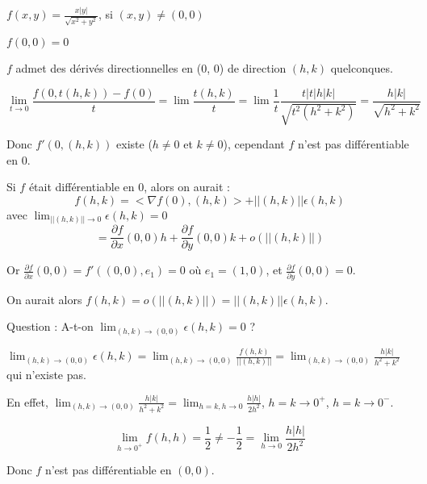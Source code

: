 		\begin{exemple} 
		
		$f(x, y) = \frac{x |y|}{\sqrt{x^2+y^2}}$, si $(x, y) \ne (0, 0)$
		
		$f(0, 0) = 0$
		
		$f$ admet des dérivés directionnelles en (0, 0) de direction $(h, k)$ quelconques.
		
		\[ \lim_{t \rightarrow 0} \frac{ f(0, t(h, k)) - f(0) }{t} = \lim \frac{ t(h, k)}{t} = \lim \frac{1}{t} \frac{t |t| h |k|}{ \sqrt{t^2 (h^2+k^2)}} = \frac{h|k|}{\sqrt{h^2+k^2}} \]
		
		Donc $f'(0, (h, k))$ existe ($h\ne0$ et $k\ne0$), cependant $f$ n'est pas différentiable en $0$.
		
		Si $f$ était différentiable en 0, alors on aurait : \[ f(h, k) = < \nabla f(0), (h, k)> + ||(h, k)|| \epsilon (h, k) \] 
		avec $\lim_{||(h, k)|| \rightarrow 0} \epsilon (h, k) = 0$
		\[ = \frac{ \partial f}{\partial x} (0, 0) h + \frac{ \partial f}{\partial y} (0, 0) k + o(||(h, k)||) \]
		
		Or $ \frac{ \partial f}{\partial x} (0, 0) = f' ((0, 0), e_1) = 0$ où $e_1 = (1, 0)$, et $ \frac{ \partial f}{\partial y} (0, 0) = 0$.
		
		On aurait alors $f(h, k) = o(||(h, k)||) = ||(h, k)|| \epsilon (h, k)$.
		
		Question : A-t-on $\lim_{(h, k) \rightarrow (0, 0)} \epsilon (h, k) = 0 $ ?
		
		$\lim_{(h, k) \rightarrow (0, 0)} \epsilon (h, k) = \lim_{(h, k) \rightarrow (0, 0)} \frac{f(h, k)}{||(h, k)||} = \lim_{(h, k) \rightarrow (0, 0)} \frac{h|k|}{h^2+k^2}$ qui n'existe pas.
		
		En effet, $\lim_{(h, k) \rightarrow (0, 0)} \frac{h|k|}{h^2+k^2} = \lim_{h=k, h \rightarrow 0} \frac{h|h|}{2h^2}$, $h=k \rightarrow 0^+$,  $h=k \rightarrow 0^-$.
		
		\[ \lim_{h \rightarrow 0^+} f(h, h) = \frac{1}{2} \ne -\frac{1}{2} = \lim_{h \rightarrow 0} \frac{h|h|}{2h^2} \]
		
		Donc $f$ n'est pas différentiable en $(0, 0)$.
		\end{exemple}
		
